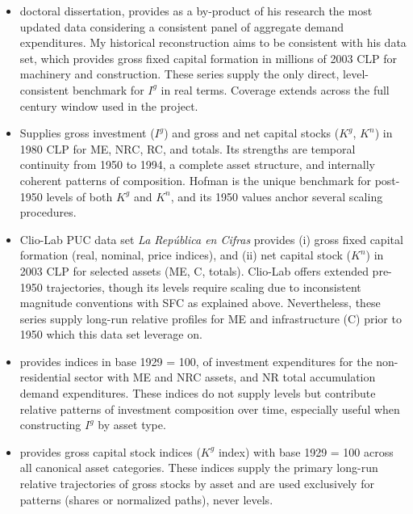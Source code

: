 \documentclass[11pt,a4paper]{article}
\begin{document}
\begin{itemize}
    \item \citet{PerezEyzaguirre2019} doctoral dissertation, provides as a by-product of his research the most updated data considering a consistent panel of aggregate demand expenditures. My historical reconstruction aims to be consistent with his data set, which provides gross fixed capital formation in millions of 2003 CLP for machinery and construction. These series supply the only direct, level-consistent benchmark for $I^g$ in
    real terms. Coverage extends across the full century window used in the project.

    \item \citet{Hofman2000} Supplies gross investment ($I^g$) and gross and net capital stocks ($K^g$, $K^n$) in
    1980 CLP for ME, NRC, RC, and totals. Its strengths are temporal continuity from 1950 to 1994, a complete
    asset structure, and internally coherent patterns of composition. Hofman is the unique benchmark
    for post-1950 levels of both $K^g$ and $K^n$, and its 1950 values anchor several scaling procedures.

    \item Clio-Lab PUC data set \textit{La República en Cifras} \citep{Diaz2016, Diaz2023} provides (i) gross fixed capital formation (real, nominal, price indices), and (ii) net capital
    stock ($K^n$) in 2003 CLP for selected assets (ME, C, totals). Clio-Lab offers extended pre-1950 trajectories, though its levels require scaling due to inconsistent magnitude conventions with SFC as explained above. Nevertheless, these series supply long-run relative profiles for ME and infrastructure (C) prior to 1950 which this data set leverage on.

    \item \citet{Tafunell2013} provides indices in base 1929 = 100, of investment expenditures for the non-residential sector with  ME and NRC assets, and NR total accumulation demand expenditures. These indices do not supply levels but contribute relative patterns of investment composition over time, especially useful when constructing $I^g$ by asset type.

    \item \citet{TafunellDucoing2016} provides gross capital stock indices ($K^g$ index) with base 1929 = 100
    across all canonical asset categories. These indices supply the primary long-run relative trajectories
    of gross stocks by asset and are used exclusively for patterns (shares or normalized paths), never
    levels.
\end{itemize}
\end{document}
